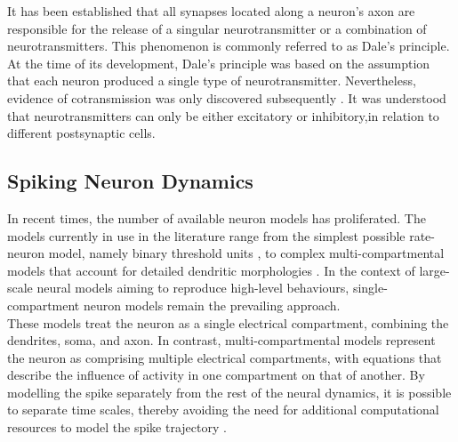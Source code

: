 \noindent It has been established that all synapses located along a neuron's axon are responsible for the release of a singular neurotransmitter or a combination of neurotransmitters. This phenomenon is commonly referred to as Dale's principle. At the time of its development, Dale's principle was based on the assumption that each neuron produced a single type of neurotransmitter. Nevertheless, evidence of cotransmission was only discovered subsequently \cite{burnstock2004cotransmission}. It was understood that neurotransmitters can only be either excitatory or inhibitory,in relation to different postsynaptic cells.

\subsection[Spiking Neuron Dynamics]{Spiking Neuron Dynamics}

\noindent In recent times, the number of available neuron models has proliferated. The models currently in use in the literature range from the simplest possible rate-neuron model, namely binary threshold units \cite{stocks2001information}, to complex multi-compartmental models that account for detailed dendritic morphologies \cite{markram2015reconstruction}. In the context of large-scale neural models aiming to reproduce high-level behaviours, single-compartment neuron models remain the prevailing approach. \\

\noindent These models treat the neuron as a single electrical compartment, combining the dendrites, soma, and axon. In contrast, multi-compartmental models represent the neuron as comprising multiple electrical compartments, with equations that describe the influence of activity in one compartment on that of another. By modelling the spike separately from the rest of the neural dynamics, it is possible to separate time scales, thereby avoiding the need for additional computational resources to model the spike trajectory \cite{abbott1999lapicque}. \\



